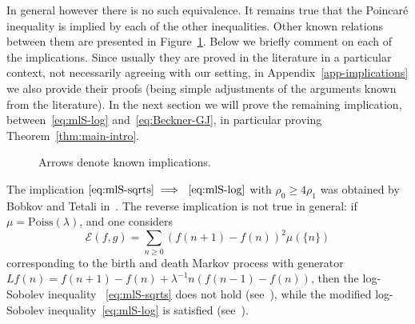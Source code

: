 \documentclass[a4paper]{amsart}
\theoremstyle{definition}
\theoremstyle{remark}
\numberwithin{equation}{section}
\begin{document}
In general however there is no such equivalence. It remains true that the Poincar\'e inequality is implied by each of the other inequalities. Other known relations between them are presented in Figure~\ref{fig:diagram}.
Below we briefly comment on each of the implications. 
Since usually they are proved in the literature in a particular context, not necessarily agreeing with our setting, in Appendix~\ref{app-implications} we also provide their proofs (being simple adjustments of the arguments known from the literature). 
In the next section we will prove the remaining implication, between~\eqref{eq:mlS-log} and~\eqref{eq:Beckner-GJ}, in particular proving Theorem~\ref{thm:main-intro}.

\begin{figure}[h] %
\caption{Arrows denote known implications.}
\label{fig:diagram} %
\end{figure}

The implication $\eqref{eq:mlS-sqrts} \implies~\eqref{eq:mlS-log}$ with $\rho_0\geq 4\rho_1$ was obtained by Bobkov and Tetali in~\cite{MR2283379}. The reverse implication is not true in general: if $\mu = \text{Poiss}(\lambda)$, and one considers $$\mathcal{E}(f,g) = \sum_{n \geq 0} (f(n+1)-f(n))^2\mu(\{n\})$$ corresponding to the birth and death Markov process with generator $Lf(n) = f(n+1)-f(n)+\lambda^{-1} n (f(n-1)-f(n))$, then the log-Sobolev inequality ~\eqref{eq:mlS-sqrts} does not hold (see~\cite{MR1636948}), while the modified log-Sobolev inequality~\eqref{eq:mlS-log} is satisfied (see~\cite{MR1944012}).
\end{document}
